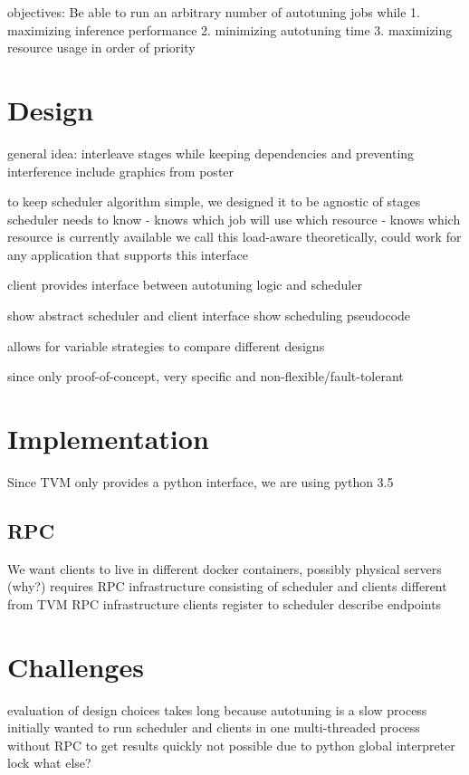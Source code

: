 objectives:
Be able to run an arbitrary number of autotuning jobs while
1. maximizing inference performance
2. minimizing autotuning time
3. maximizing resource usage
in order of priority

\section{Design}
general idea: interleave stages while keeping dependencies and preventing interference
include graphics from poster

to keep scheduler algorithm simple, we designed it to be agnostic of stages
scheduler needs to know
- knows which job will use which resource
- knows which resource is currently available
we call this load-aware
theoretically, could work for any application that supports this interface

client provides interface between autotuning logic and scheduler

show abstract scheduler and client interface
show scheduling pseudocode

allows for variable strategies to compare different designs

since only proof-of-concept, very specific and non-flexible/fault-tolerant

\section{Implementation}
Since TVM only provides a python interface, we are using python 3.5


\subsection{RPC}
We want clients to live in different docker containers, possibly physical servers (why?)
requires RPC infrastructure consisting of scheduler and clients
different from TVM RPC infrastructure
clients register to scheduler
describe endpoints

\section{Challenges}
evaluation of design choices takes long because autotuning is a slow process
initially wanted to run scheduler and clients in one multi-threaded process without RPC to get results quickly
not possible due to python global interpreter lock
what else?